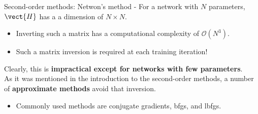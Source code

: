 \begin{frame}[t,allowframebreaks]{
    Second-order methods: Netwon's method -}
    For a network with $N$ parameters, 
     $\vect{H}$ has a
    a dimension of $N \times N$.\\
    \begin{itemize}
        \small
        \item Inverting such a matrix 
        has a computational complexity of $\mathcal{O}(N^3)$.
        \item Such a matrix inversion is required at each training iteration!
    \end{itemize}
    \vspace{0.2cm}
    Clearly, this is {\bf impractical except 
    for networks with few parameters}.\\
    \vspace{0.2cm}
    As it was mentioned in the introduction to the
    \glspl{second-order method},
    a number of {\bf approximate methods} avoid that inversion. 
    \begin{itemize}
        \small
        \item 
        Commonly used methods are
        \Gls{conjugate gradients},
        \gls{bfgs}, and
        \gls{lbfgs}.
    \end{itemize}
    
\end{frame}
